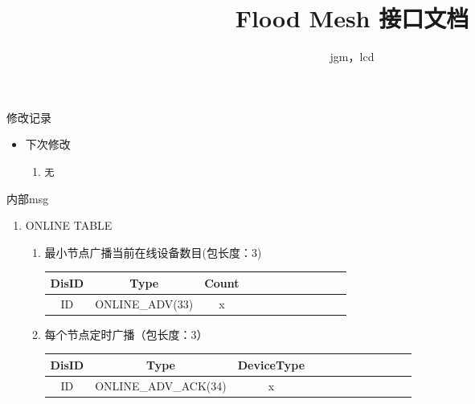 \documentclass[a4paper, 12pt]{ctexart}
\begin{document}
\title{Flood Mesh 接口文档}
\author{jgm，lcd}
\maketitle
\newpage

\begin{flushleft}

\huge{修改记录}
\large
\begin{itemize}
        \item 下次修改 
                \begin{enumerate}
                        \item \texttt{无} 
                \end{enumerate}
\end{itemize}


\newpage



\begin{spacing}{1.5}




\huge{内部msg}
\small
\begin{enumerate}

\item ONLINE TABLE
        \begin{enumerate}
        \item 最小节点广播当前在线设备数目(包长度：3)
        \begin{tabular}{|c|c|c|c|c|c|c|c|c|c|c|c|}
                \hline
                DisID & Type  &  Count \\	                
		\hline
                ID & ONLINE\_ADV(33) & x \\
                \hline
        \end{tabular}

        \item 每个节点定时广播（包长度：3）
        \begin{tabular}{|c|c|c|c|c|c|c|c|c|c|c|c|}
                \hline
                DisID & Type  &  DeviceType \\	                
		\hline
                ID & ONLINE\_ADV\_ACK(34) & x \\
                \hline
        \end{tabular}

        \end{enumerate}

\end{enumerate}

\end{spacing}
\end{flushleft}
\end{document}
